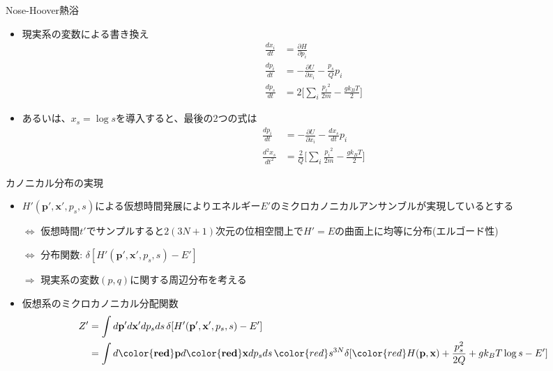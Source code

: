 \documentclass[dvipdfmx]{beamer}
\begin{document}
\begin{frame}[t,fragile]{Nose-Hoover熱浴}
  \begin{itemize}
  \item 現実系の変数による書き換え
    \begin{align*}
      \frac{dx_i}{dt} &= \frac{\partial H}{\partial p_i} \\
      \frac{dp_i}{dt} &= -\frac{\partial U}{\partial x_i} -\frac{p_s}{Q} p_i \\
      \frac{dp_s}{dt} &= 2 \big[ \sum_i \frac{{p_i}^2}{2m} - \frac{g k_B T}{2} \big]
    \end{align*}
  \item あるいは、$x_s = \log s$を導入すると、最後の2つの式は
    \begin{align*}
      \frac{dp_i}{dt} &= -\frac{\partial U}{\partial x_i} -\frac{dx_s}{dt} p_i \\
      \frac{d^2x_s}{dt^2} &= \frac{2}{Q} \big[ \sum_i \frac{{p_i}^2}{2m} - \frac{g k_B T}{2} \big]
    \end{align*}
  \end{itemize}
\end{frame}

\begin{frame}[t,fragile]{カノニカル分布の実現}
  \begin{itemize}
  \item $H'(\mathbf{p}',\mathbf{x}',p_s,s)$による仮想時間発展によりエネルギー$E'$のミクロカノニカルアンサンブルが実現しているとする

    $\Leftrightarrow$ 仮想時間$t'$でサンプルすると$2(3N+1)$次元の位相空間上で$H'=E$の曲面上に均等に分布(エルゴード性)
    
    $\Leftrightarrow$ 分布関数: $\delta [ H'(\mathbf{p}',\mathbf{x}',p_s,s) - E']$
    
    $\Rightarrow$ 現実系の変数$(p,q)$に関する周辺分布を考える
  \item 仮想系のミクロカノニカル分配関数
    \begin{align*}
      Z'&=\int d\mathbf{p}' d\mathbf{x}' dp_s ds \, \delta [ H'(\mathbf{p}',\mathbf{x}',p_s,s) - E'] \\
      &=\int d\mathbf{{\color{red}p}} d\mathbf{{\color{red}x}} dp_s ds \, {\color{red}s^{3N}} \delta [ {\color{red}H(\mathbf{p},\mathbf{x})} + \frac{p_s^2}{2Q} + g k_B T \log s - E']
    \end{align*}
  \end{itemize}
\end{frame}
\end{document}
